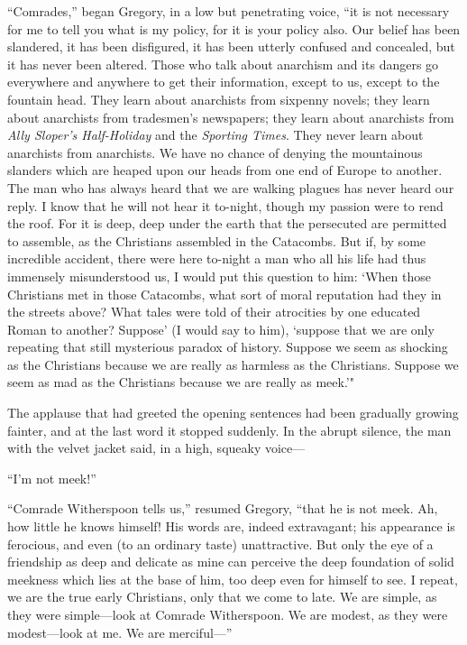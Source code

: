 \documentclass{book}
\begin{document}
“Comrades,” began Gregory, in a low but penetrating voice, “it is not necessary for me to tell you what is my policy, for it is your policy also. Our belief has been slandered, it has been disfigured, it has been utterly confused and concealed, but it has never been altered. Those who talk about anarchism and its dangers go everywhere and anywhere to get their information, except to us, except to the fountain head. They learn about anarchists from sixpenny novels; they learn about anarchists from tradesmen’s newspapers; they learn about anarchists from \emph{Ally Sloper’s Half-Holiday} and the \emph{Sporting Times}. They never learn about anarchists from anarchists. We have no chance of denying the mountainous slanders which are heaped upon our heads from one end of Europe to another. The man who has always heard that we are walking plagues has never heard our reply. I know that he will not hear it to-night, though my passion were to rend the roof. For it is deep, deep under the earth that the persecuted are permitted to assemble, as the Christians assembled in the Catacombs. But if, by some incredible accident, there were here to-night a man who all his life had thus immensely misunderstood us, I would put this question to him: ‘When those Christians met in those Catacombs, what sort of moral reputation had they in the streets above? What tales were told of their atrocities by one educated Roman to another? Suppose’ (I would say to him), ‘suppose that we are only repeating that still mysterious paradox of history. Suppose we seem as shocking as the Christians because we are really as harmless as the Christians. Suppose we seem as mad as the Christians because we are really as meek.’"

The applause that had greeted the opening sentences had been gradually growing fainter, and at the last word it stopped suddenly. In the abrupt silence, the man with the velvet jacket said, in a high, squeaky voice—

“I’m not meek!”

“Comrade Witherspoon tells us,” resumed Gregory, “that he is not meek. Ah, how little he knows himself! His words are, indeed extravagant; his appearance is ferocious, and even (to an ordinary taste) unattractive. But only the eye of a friendship as deep and delicate as mine can perceive the deep foundation of solid meekness which lies at the base of him, too deep even for himself to see. I repeat, we are the true early Christians, only that we come to late. We are simple, as they were simple—look at Comrade Witherspoon. We are modest, as they were modest—look at me. We are merciful—”
\end{document}
